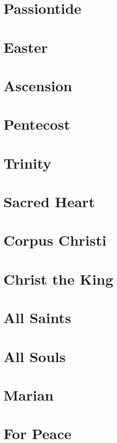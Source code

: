 \documentclass[11pt]{article} %
\begin{document}

\section{Passiontide}

\section{Easter}

\section{Ascension}

\section{Pentecost}

\section{Trinity}

\section{Sacred Heart}

\section{Corpus Christi}

\section{Christ the King}

\section{All Saints}

\section{All Souls}

\section{Marian}

\section{For Peace}
\end{document}
